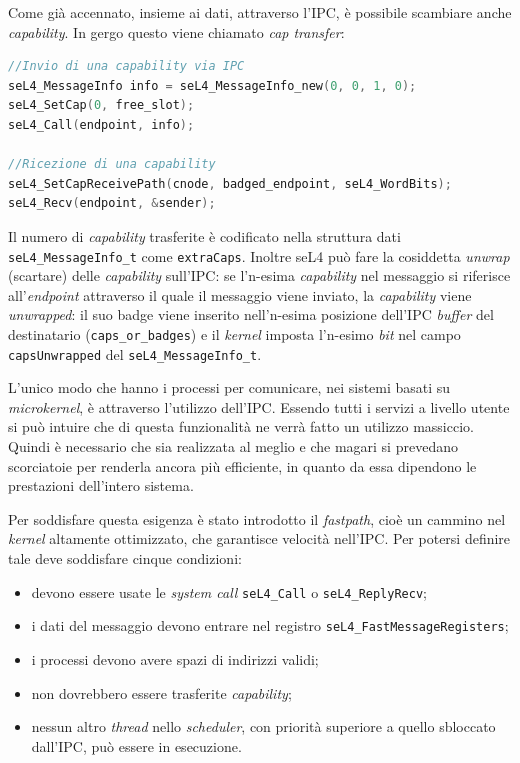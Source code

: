 Come già accennato, insieme ai dati, attraverso l'IPC, è possibile scambiare anche \textit{capability}. In gergo questo viene chiamato \textit{cap transfer}:
\begin{lstlisting}[language=C++]
//Invio di una capability via IPC
seL4_MessageInfo info = seL4_MessageInfo_new(0, 0, 1, 0);
seL4_SetCap(0, free_slot);
seL4_Call(endpoint, info);

//Ricezione di una capability
seL4_SetCapReceivePath(cnode, badged_endpoint, seL4_WordBits);
seL4_Recv(endpoint, &sender);
\end{lstlisting}

Il numero di \textit{capability} trasferite è codificato nella struttura dati \texttt{seL4\_MessageInfo\_t} come \texttt{extraCaps}.
Inoltre seL4 può fare la cosiddetta \textit{unwrap} (scartare) delle \textit{capability} sull'IPC: se l'n-esima \textit{capability} nel messaggio si riferisce all'\textit{endpoint} attraverso il quale il messaggio viene inviato, la \textit{capability} viene \textit{unwrapped}: il suo badge viene inserito nell'n-esima posizione dell'IPC \textit{buffer} del destinatario (\texttt{caps\_or\_badges}) e il \textit{kernel} imposta l'n-esimo \textit{bit} nel campo \texttt{capsUnwrapped} del \texttt{seL4\_MessageInfo\_t}.

L'unico modo che hanno i processi per comunicare, nei sistemi basati su \textit{microkernel}, è attraverso l'utilizzo dell'IPC. Essendo tutti i servizi a livello utente si può intuire che di questa funzionalità ne verrà fatto un utilizzo massiccio. Quindi è necessario che sia realizzata al meglio e che magari si prevedano scorciatoie per renderla ancora più efficiente, in quanto da essa dipendono le prestazioni dell'intero sistema.

Per soddisfare questa esigenza è stato introdotto il \textit{fastpath}, cioè un cammino nel \textit{kernel} altamente ottimizzato, che garantisce velocità nell'IPC. Per potersi definire tale deve soddisfare cinque condizioni:
\begin{itemize}
	\item devono essere usate le \textit{system call} \texttt{seL4\_Call} o \texttt{seL4\_ReplyRecv};
	\item i dati del messaggio devono entrare nel registro \texttt{seL4\_FastMessageRegisters};
	\item i processi devono avere spazi di indirizzi validi;
	\item non dovrebbero essere trasferite \textit{capability};
	\item nessun altro \textit{thread} nello \textit{scheduler}, con priorità superiore a quello sbloccato dall'IPC, può essere in esecuzione.
\end{itemize}

